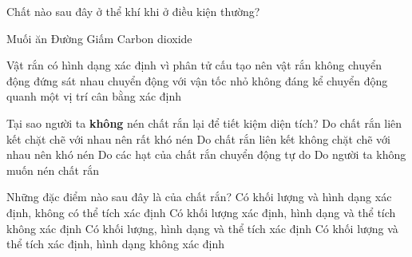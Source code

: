 \begin{ex}%
	Chất nào sau đây ở thể khí khi ở điều kiện thường?
	
	\choice
	{Muối ăn}
	{Đường}
	{Giấm}
	{\True Carbon dioxide}
	\end{ex}









%


\begin{ex}%
	Vật rắn có hình dạng xác định vì phân tử cấu tạo nên vật rắn
	\choice
	{không chuyển động}
	{đứng sát nhau}
	{chuyển động với vận tốc nhỏ không đáng kể}
	{\True chuyển động quanh một vị trí cân bằng xác định}
	\end{ex}

\begin{ex}%
	Tại sao người ta \textbf{không} nén chất rắn lại để tiết kiệm diện tích?
	\choice
	{\True Do chất rắn liên kết chặt chẽ với nhau nên rất khó nén}
	{Do chất rắn liên kết không chặt chẽ với nhau nên khó nén}
	{Do các hạt của chất rắn chuyển động tự do}
	{Do người ta không muốn nén chất rắn}
	\end{ex}

\begin{ex}%
	Những đặc điểm nào sau đây là của chất rắn?
	\choice
	{Có khối lượng và hình dạng xác định, không có thể tích xác định}
	{Có khối lượng xác định, hình dạng và thể tích không xác định}
	{\True Có khối lượng, hình dạng và thể tích xác định}
	{Có khối lượng và thể tích xác định, hình dạng không xác định}
	\end{ex}



